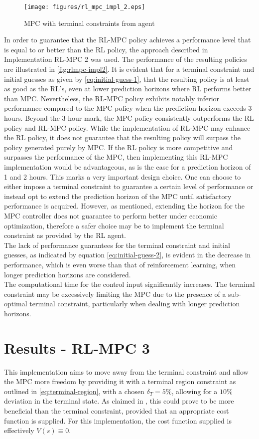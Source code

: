 \begin{figure}[H]
	\centering
	\texttt{[image: figures/rl\_mpc\_impl\_2.eps]}
	\caption{MPC with terminal constraints from agent}
	\label{fig:rlmpc-impl2}
\end{figure}

In order to guarantee that the RL-MPC policy achieves a performance level that is equal to or better than the RL policy, the approach described in Implementation RL-MPC 2 was used.  The performance of the resulting policies are illustrated in \autoref{fig:rlmpc-impl2}. It is evident that for a terminal constraint and initial guesses as given by \autoref{eq:initial-guess-1}, that the resulting policy is at least as good as the RL's, even at lower prediction horizons where RL performs better than MPC. Nevertheless, the RL-MPC policy exhibits notably inferior performance compared to the MPC policy when the prediction horizon exceeds 3 hours. Beyond the 3-hour mark, the MPC policy consistently outperforms the RL policy and RL-MPC policy.  While the implementation of RL-MPC may enhance the RL policy, it does not guarantee that the resulting policy will surpass the policy generated purely by MPC. If the RL policy is more competitive and surpasses the performance of the MPC, then implementing this RL-MPC implementation would be advantageous, as is the case for a prediction horizon of 1 and 2 hours. This marks a very important design choice. One can choose to either impose a terminal constraint to guarantee a certain level of performance or instead opt to extend the prediction horizon of the MPC until satisfactory performance is acquired. However, as mentioned, extending the horizon for the MPC controller does not guarantee to perform better under economic optimization, therefore a safer choice may be to implement the terminal constraint as provided by the RL agent.
\\
The lack of performance guarantees for the terminal constraint and initial guesses, as indicated by equation \autoref{eq:initial-guess-2}, is evident in the decrease in performance, which is even worse than that of reinforcement learning, when longer prediction horizons are considered.\\

The computational time for the control input significantly increases. The terminal constraint may be excessively limiting the MPC due to the presence of a sub-optimal terminal constraint, particularly when dealing with longer prediction horizons.

\section{Results - RL-MPC 3}
This implementation aims to move away from the terminal constraint and allow the MPC more freedom by providing it with a terminal region constraint as outlined in \autoref{eq:terminal-region}, with a chosen $\delta_T = 5\%$, allowing for a $10\%$ deviation in the terminal state. As claimed in \cite{amritEconomicOptimizationUsing2011}, this could prove to be more beneficial than the terminal constraint, provided that an appropriate cost function is supplied. For this implementation, the cost function supplied is effectively $V(s) \equiv 0$. 


